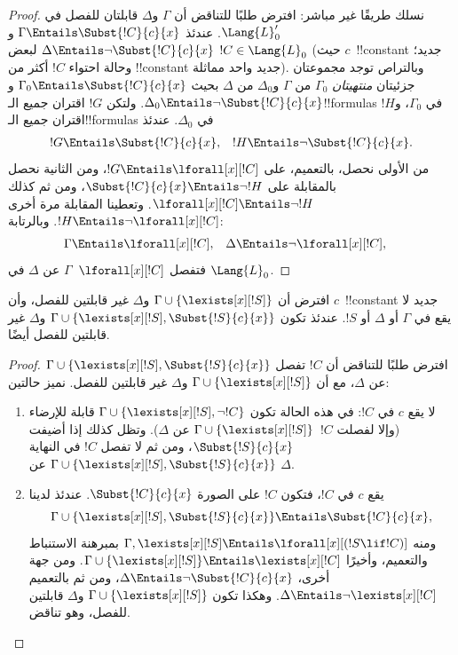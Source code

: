 \documentclass[../../../include/open-logic-section]{subfiles}
\begin{document}
\begin{proof}
نسلك طريقًا غير مباشر: افترض طلبًا للتناقض أن $\Gamma$ و$\Delta$ قابلتان
للفصل في $\Lang{L}'_0$. عندئذ
$\Gamma \Entails \Subst{!C}{c}{x}$ و
$\Delta \Entails \lnot \Subst{!C}{c}{x}$ لبعض
$!C \in \Lang{L}_0$ (حيث $c$~!!{constant} جديد؛ وحالة احتواء $!C$ أكثر
من !!{constant} جديد واحد مماثلة). وبالتراص توجد مجموعتان جزئيتان
\emph{منتهيتان} $\Gamma_0$ من $\Gamma$ و$\Delta_0$ من $\Delta$ بحيث
$\Gamma_0 \Entails \Subst{!C}{c}{x}$ و
$\Delta_0 \Entails \lnot \Subst{!C}{c}{x}$. ولتكن $!G$ اقتران جميع
الـ!!{formula}s في $\Gamma_0$، و$!H$ اقتران جميع الـ!!{formula}s في
$\Delta_0$. عندئذ
\begin{align*}
  !G & \Entails \Subst{!C}{c}{x}, & !H  \Entails \lnot \Subst{!C}{c}{x}.
\end{align*}
من الأولى نحصل، بالتعميم، على $!G \Entails \lforall[x][!C]$، ومن
الثانية نحصل بالمقابلة على
$\Subst{!C}{c}{x} \Entails \lnot !H$، ومن ثم كذلك
$\lforall[x][!C] \Entails \lnot !H$. وتعطينا المقابلة مرة أخرى
$!H \Entails \lnot \lforall[x][!C]$. وبالرتابة:
\begin{align*}
  \Gamma &\Entails \lforall[x][!C], &
  \Delta & \Entails \lnot \lforall[x][!C],
\end{align*}
فتفصل $\lforall[x][!C]$~$\Gamma$ عن $\Delta$ في $\Lang{L}_0$.
\end{proof}

\begin{lem}
افترض أن $\Gamma \cup \{ \lexists[x][!S] \}$ و$\Delta$ غير قابلتين
للفصل، وأن $c$~!!{constant} جديد لا يقع في $\Gamma$ أو $\Delta$ أو
$!S$. عندئذ تكون
$\Gamma \cup \{ \lexists[x][!S], \Subst{!S}{c}{x} \}$ و$\Delta$
غير قابلتين للفصل أيضًا.
\end{lem}

\begin{proof}
افترض طلبًا للتناقض أن $!C$ تفصل
$\Gamma \cup \{\lexists[x][!S], \Subst{!S}{c}{x}\}$ عن $\Delta$،
مع أن $\Gamma \cup \{\lexists[x][!S] \}$ و$\Delta$ غير قابلتين
للفصل. نميز حالتين:
\begin{enumerate}
\item لا يقع $c$ في $!C$: في هذه الحالة تكون
  $\Gamma \cup \{\lexists[x][!S], \lnot!C \}$ قابلة للإرضاء (وإلا
  لفصلت $!C$~$\Gamma \cup \{\lexists[x][!S] \}$ عن $\Delta$).
  وتظل كذلك إذا أضيفت $\Subst{!S}{c}{x}$، ومن ثم لا تفصل $!C$ في
  النهاية $\Gamma \cup \{ \lexists[x][!S], \Subst{!S}{c}{x} \}$
  عن $\Delta$.
\item يقع $c$ في $!C$، فتكون $!C$ على الصورة
  $\Subst{!C}{c}{x}$. عندئذ لدينا
  \[
  \Gamma \cup \{ \lexists[x][!S], \Subst{!S}{c}{x}\} \Entails \Subst{!C}{c}{x},
  \]
  ومنه $\Gamma, \lexists[x][!S] \Entails \lforall[x][(!S \lif !C)]$
  بمبرهنة الاستنباط والتعميم، وأخيرًا
  $\Gamma \cup \{ \lexists[x][!S] \} \Entails \lexists[x][!C]$.
  ومن جهة أخرى، $\Delta \Entails \lnot \Subst{!C}{c}{x}$، ومن ثم
  بالتعميم $\Delta \Entails \lnot \lexists[x][!C]$. وهكذا تكون
  $\Gamma \cup \{\lexists[x][!S] \}$ و$\Delta$ قابلتين للفصل، وهو
  تناقض.
\end{enumerate}
\end{proof}
\end{document}
